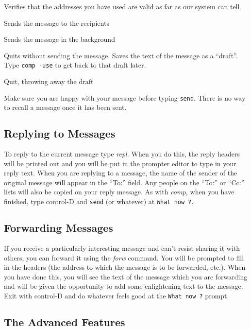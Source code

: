  Verifies that the addresses you have
				used are valid as far as our system
				can tell

\titem[\tt send] Sends the message to the recipients

\titem[\tt push] Sends the message in the background

\titem[\tt quit] Quits without sending the message.
				Saves the text of the message as
				a ``draft''. Type \verb|comp -use| to
				get back to that draft later.

 Quit, throwing away the draft
\endgroup

\bigskip

Make sure you are happy with your message before typing \verb|send|.  There
is no way to recall a message once it has been sent.

\subsection{Replying to Messages}

To reply to the current message type {\it repl.}  When you do this, 
the reply headers will be printed out and you will be put in the prompter
editor to type in your reply text. When you are replying  to a message,
the name of the sender of the original message will appear in the
``To:'' field.  Any people on the ``To:'' or ``Cc:'' lists will also
be copied on your reply message. As with {\it comp,} when you have
finished, type control-D and \verb|send| (or whatever) at \verb|What now ?|.

\subsection{Forwarding Messages}

If you receive a particularly interesting message and can't resist
sharing it with others, you can forward it using the {\it forw\/}
command.  You will be prompted to fill in the headers (the address
to which the message is to be forwarded, etc.). When you have done this,
you will see the text of the message which you are forwarding and will be
given the opportunity to add some enlightening text to the message.
Exit with control-D and do whatever feels good at the \verb|What now ?|
prompt.

\subsection{The Advanced Features}

